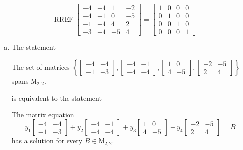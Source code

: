 \begin{exerciseAnswer} 


\[\operatorname{RREF} \left[\begin{array}{cccc}
-4 & -4 & 1 & -2 \\
-4 & -1 & 0 & -5 \\
-1 & -4 & 4 & 2 \\
-3 & -4 & -5 & 4
\end{array}\right] = \left[\begin{array}{cccc}
1 & 0 & 0 & 0 \\
0 & 1 & 0 & 0 \\
0 & 0 & 1 & 0 \\
0 & 0 & 0 & 1
\end{array}\right] \]


\begin{enumerate}[(a)]
\item The statement 
\begin{center}\begin{minipage}{0.8\textwidth}
 The set of matrices \( \left\{ \left[\begin{array}{cc}
-4 & -4 \\
-1 & -3
\end{array}\right] , \left[\begin{array}{cc}
-4 & -1 \\
-4 & -4
\end{array}\right] , \left[\begin{array}{cc}
1 & 0 \\
4 & -5
\end{array}\right] , \left[\begin{array}{cc}
-2 & -5 \\
2 & 4
\end{array}\right] \right\} \) spans \(\mathrm{M}_{2,2}\). 
\end{minipage}\end{center}
     is equivalent to the statement 
\begin{center}\begin{minipage}{0.8\textwidth}
 The matrix equation \[ y_{1} \left[\begin{array}{cc}
-4 & -4 \\
-1 & -3
\end{array}\right] + y_{2} \left[\begin{array}{cc}
-4 & -1 \\
-4 & -4
\end{array}\right] + y_{3} \left[\begin{array}{cc}
1 & 0 \\
4 & -5
\end{array}\right] + y_{4} \left[\begin{array}{cc}
-2 & -5 \\
2 & 4
\end{array}\right] =B\] has a solution for every \(B \in \mathrm{M}_{2,2}\). 
\end{minipage}\end{center}
    

\end{enumerate}
\end{exerciseAnswer}
